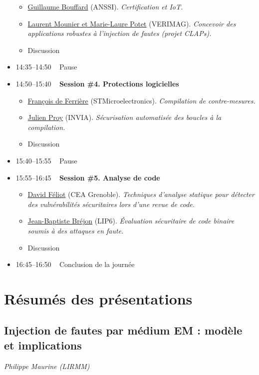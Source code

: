 \documentclass[a4paper,11pt]{article}
\begin{document}
\begin{itemize}
\begin{itemize}
\item \hyperref[sec:orgb99b333]{Guillaume Bouffard} (ANSSI). \emph{Certification et IoT.}
\item \hyperref[sec:orgb2fe0a1]{Laurent Mounier et Marie-Laure Potet} (VERIMAG). \emph{Concevoir des applications robustes à l’injection de fautes (projet CLAPs).}
\item Discussion
\end{itemize}
\item 14:35--14:50   Pause
\item 14:50--15:40   \textbf{Session \#4. Protections logicielles}
\begin{itemize}
\item \hyperref[sec:orgaa25c6b]{François de Ferrière} (STMicroelectronics). \emph{Compilation de contre-mesures.}
\item \hyperref[sec:org323bb42]{Julien Proy} (INVIA). \emph{Sécurisation automatisée des boucles à la compilation.}
\item Discussion
\end{itemize}
\item 15:40--15:55   Pause
\item 15:55--16:45   \textbf{Session \#5. Analyse de code}
\begin{itemize}
\item \hyperref[sec:orgced509d]{David Féliot} (CEA Grenoble). \emph{Techniques d’analyse statique pour détecter des vulnérabilités sécuritaires lors d’une revue de code.}
\item \hyperref[sec:orgab1ada4]{Jean-Baptiste Bréjon} (LIP6). \emph{Évaluation sécuritaire de code binaire soumis à des attaques en faute.}
\item Discussion
\end{itemize}
\item 16:45--16:50   Conclusion de la journée
\end{itemize}

\section{Résumés des présentations}
\label{sec:org08ccde7}

\subsection{Injection de fautes par médium EM : modèle et implications}
\label{sec:orga168fcd}
\emph{Philippe Maurine (LIRMM)}
\end{document}
